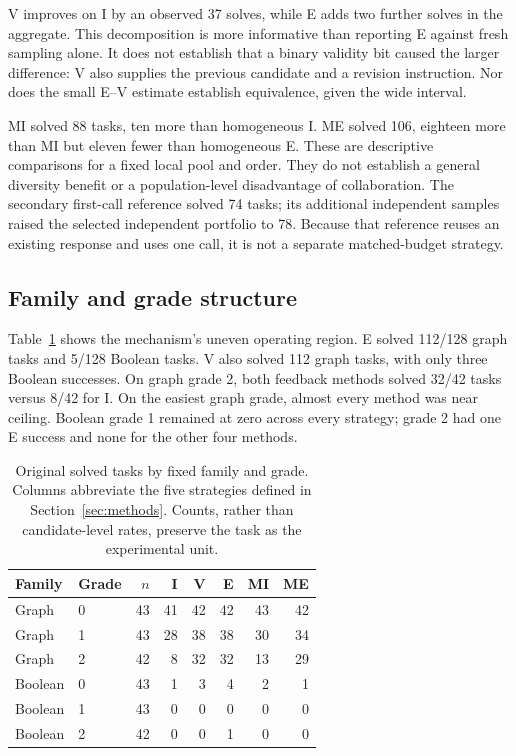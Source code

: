 V improves on I by an observed 37 solves, while E adds two further solves in the aggregate. This decomposition is more informative than reporting E against fresh sampling alone. It does not establish that a binary validity bit caused the larger difference: V also supplies the previous candidate and a revision instruction. Nor does the small E--V estimate establish equivalence, given the wide interval.

MI solved 88 tasks, ten more than homogeneous I. ME solved 106, eighteen more than MI but eleven fewer than homogeneous E. These are descriptive comparisons for a fixed local pool and order. They do not establish a general diversity benefit or a population-level disadvantage of collaboration. The secondary first-call reference solved 74 tasks; its additional independent samples raised the selected independent portfolio to 78. Because that reference reuses an existing response and uses one call, it is not a separate matched-budget strategy.

\subsection{Family and grade structure}

Table~\ref{tab:strata} shows the mechanism's uneven operating region. E solved 112/128 graph tasks and 5/128 Boolean tasks. V also solved 112 graph tasks, with only three Boolean successes. On graph grade 2, both feedback methods solved 32/42 tasks versus 8/42 for I. On the easiest graph grade, almost every method was near ceiling. Boolean grade 1 remained at zero across every strategy; grade 2 had one E success and none for the other four methods.

\begin{table}[t]
\caption{Original solved tasks by fixed family and grade. Columns abbreviate the five strategies defined in Section~\ref{sec:methods}. Counts, rather than candidate-level rates, preserve the task as the experimental unit.}
\label{tab:strata}
\centering\small
\begin{tabular}{llrrrrrr}
\toprule
Family & Grade & $n$ & I & V & E & MI & ME\\
\midrule
Graph & 0 & 43 & 41 & 42 & 42 & 43 & 42\\
Graph & 1 & 43 & 28 & 38 & 38 & 30 & 34\\
Graph & 2 & 42 & 8 & 32 & 32 & 13 & 29\\
Boolean & 0 & 43 & 1 & 3 & 4 & 2 & 1\\
Boolean & 1 & 43 & 0 & 0 & 0 & 0 & 0\\
Boolean & 2 & 42 & 0 & 0 & 1 & 0 & 0\\
\bottomrule
\end{tabular}
\end{table}

